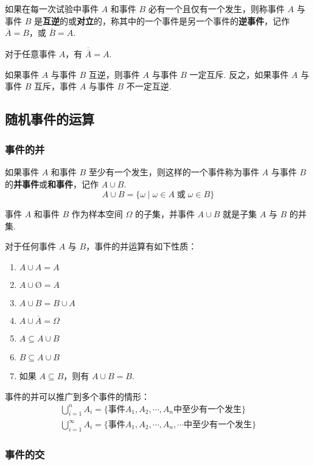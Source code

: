 如果在每一次试验中事件 $A$ 和事件 $B$ 必有一个且仅有一个发生，则称事件 $A$ 与事件 $B$ 是\textbf{互逆}的或\textbf{对立}的，称其中的一个事件是另一个事件的\textbf{逆事件}，记作 $\overline{A}=B$，或 $\overline{B}=A$.

对于任意事件 $A$，有 $\overline{\overline{A}}=A$.

如果事件 $A$ 与事件 $B$ 互逆，则事件 $A$ 与事件 $B$ 一定互斥. 反之，如果事件 $A$ 与事件 $B$ 互斥，事件 $A$ 与事件 $B$ 不一定互逆.

\subsection{随机事件的运算}

\subsubsection{事件的并}

如果事件 $A$ 和事件 $B$ 至少有一个发生，则这样的一个事件称为事件 $A$ 与事件 $B$ 的\textbf{并事件}或\textbf{和事件}，记作 $A \cup B$.
$$
A \cup B = \{ \omega \mid \omega \in A \;\text{或}\; \omega \in B \}
$$

事件 $A$ 和事件 $B$ 作为样本空间 $\varOmega$ 的子集，并事件 $A \cup B$ 就是子集 $A$ 与 $B$ 的并集.

对于任何事件 $A$ 与 $B$，事件的并运算有如下性质：
\begin{enumerate}
    \item $A \cup A = A$
    \item $A \cup \text{\O} = A$
    \item $A \cup B = B \cup A$
    \item $A \cup \overline{A} = \varOmega$
    \item $A \subseteq A \cup B$
    \item $B \subseteq A \cup B$
    \item 如果 $A \subseteq B$，则有 $A \cup B=B$.
\end{enumerate}

事件的并可以推广到多个事件的情形：
\begin{gather*}
    \bigcup_{i=1}^n A_i = \{ \text{事件} A_1,A_2,\cdots,A_n \text{中至少有一个发生} \} \\
    \bigcup_{i=1}^\infty A_i = \{ \text{事件} A_1,A_2,\cdots,A_n,\cdots \text{中至少有一个发生} \}
\end{gather*}

\subsubsection{事件的交}

